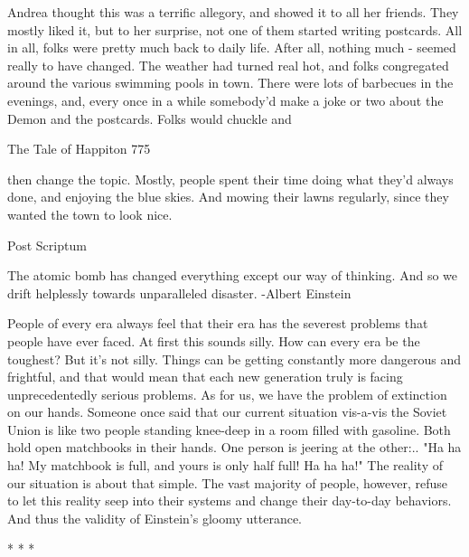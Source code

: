 Andrea thought this was a terrific allegory, and showed it to all her friends. They
mostly liked it, but to her surprise, not one of them started writing postcards.
       All in all, folks were pretty much back to daily life. After all, nothing much -
seemed really to have changed. The weather had turned real hot, and folks
congregated around the various swimming pools in town. There were lots of
barbecues in the evenings, and, every once in a while somebody'd make a joke or two
about the Demon and the postcards. Folks would chuckle and




The Tale of Happiton                                                                775

then change the topic. Mostly, people spent their time doing what they'd always done,
and enjoying the blue skies. And mowing their lawns regularly, since they wanted the
town to look nice.

Post Scriptum

                                              The atomic bomb has changed everything
                                                 except our way of thinking. And so we
                                          drift helplessly towards unparalleled disaster.
                                                                       -Albert Einstein


        People of every era always feel that their era has the severest problems that
people have ever faced. At first this sounds silly. How can every era be the toughest?
But it's not silly. Things can be getting constantly more dangerous and frightful, and
that would mean that each new generation truly is facing unprecedentedly serious
problems. As for us, we have the problem of extinction on our hands.
        Someone once said that our current situation vis-a-vis the Soviet Union is like
two people standing knee-deep in a room filled with gasoline. Both hold open
matchbooks in their hands. One person is jeering at the other:.. "Ha ha ha! My
matchbook is full, and yours is only half full! Ha ha ha!"
        The reality of our situation is about that simple. The vast majority of people,
however, refuse to let this reality seep into their systems and change their day-to-day
behaviors. And thus the validity of Einstein's gloomy utterance.

                                      *    *   *

